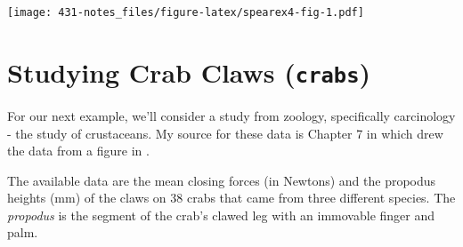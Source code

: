 \documentclass[
]{book}
\newenvironment{Shaded}{\begin{snugshade}}{\end{snugshade}}
\newcommand{\DataTypeTok}[1]{\textcolor[rgb]{0.13,0.29,0.53}{#1}}
\newcommand{\DecValTok}[1]{\textcolor[rgb]{0.00,0.00,0.81}{#1}}
\newcommand{\KeywordTok}[1]{\textcolor[rgb]{0.13,0.29,0.53}{\textbf{#1}}}
\newcommand{\NormalTok}[1]{#1}
\newcommand{\OperatorTok}[1]{\textcolor[rgb]{0.81,0.36,0.00}{\textbf{#1}}}
\newcommand{\OtherTok}[1]{\textcolor[rgb]{0.56,0.35,0.01}{#1}}
\newcommand{\StringTok}[1]{\textcolor[rgb]{0.31,0.60,0.02}{#1}}
\begin{document}
\begin{Shaded}
\end{Shaded}

\texttt{[image: 431-notes\_files/figure-latex/spearex4-fig-1.pdf]}

\hypertarget{studying-crab-claws-crabs}{%
\chapter{\texorpdfstring{Studying Crab Claws (\texttt{crabs})}{Studying Crab Claws (crabs)}}\label{studying-crab-claws-crabs}}

For our next example, we'll consider a study from zoology, specifically carcinology - the study of crustaceans. My source for these data is Chapter 7 in \citet{RamseySchafer} which drew the data from a figure in \citet{Yamada1998}.

The available data are the mean closing forces (in Newtons) and the propodus heights (mm) of the claws on 38 crabs that came from three different species. The \emph{propodus} is the segment of the crab's clawed leg with an immovable finger and palm.
\end{document}
